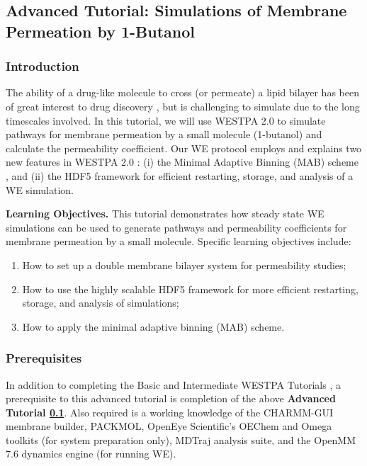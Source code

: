 \subsection{Advanced Tutorial: Simulations of Membrane Permeation by 1-Butanol}
\label{tut:mem-perm-adv}

\subsubsection{Introduction}
The ability of a drug-like molecule to cross (or permeate) a lipid bilayer has been of great interest to drug discovery \citep{zhang_mechanistic_2022}, but is challenging to simulate due to the long timescales involved. 
In this tutorial, we will use WESTPA 2.0 to simulate pathways for membrane permeation by a small molecule (1-butanol) and calculate the permeability coefficient. 
Our WE protocol employs and explains two new features in WESTPA 2.0 \citep{russo_westpa_2022}: (i) the Minimal Adaptive Binning (MAB) scheme \citep{torrillo_minimal_2021}, and (ii) the HDF5 framework for efficient restarting, storage, and analysis of a WE simulation.

\textbf{Learning Objectives.} This tutorial demonstrates how steady state WE simulations can be used to generate pathways and permeability coefficients for membrane permeation by a small molecule.  
Specific learning objectives include:
\begin{enumerate}
    \item How to set up a double membrane bilayer system for permeability studies;
    \item How to use the highly scalable HDF5 framework for more efficient restarting, storage, and analysis of simulations;
    \item How to apply the minimal adaptive binning (MAB) scheme.
\end{enumerate}

\subsubsection{Prerequisites}
In addition to completing the Basic and Intermediate WESTPA Tutorials \citep{bogetti_suite_2019}, a prerequisite to this advanced tutorial is completion of the above \textbf{Advanced Tutorial \ref{tut:mem-perm-adv}}. 
Also required is a working knowledge of the CHARMM-GUI membrane builder, PACKMOL, OpenEye Scientific’s OEChem and Omega toolkits (for system preparation only), MDTraj analysis suite, and the OpenMM 7.6 dynamics engine (for running WE). 

